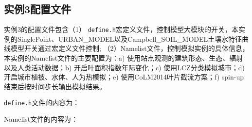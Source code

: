 \subsection{实例3配置文件}\label{ex3config}
实例3的配置文件包含（1） \texttt{define.h}宏定义文件，控制模型大模块的开关，本实例的SinglePoint、URBAN\_MODEL以及Campbell\_SOIL\_MODEL土壤水特征曲线模型开关通过宏定义文件控制; （2）Namelist文件，控制模拟实例的具体信息，本实例的Namelist文件的主要配置为：a) 使用站点观测的建筑形态、生态、辐射以及人类活动数据；b) 开启叶面积指数年际变化；c) 使用LCZ分类模拟城市；d) 开启城市植被、水体、人为热模拟；e) 使用CoLM2014叶片截流方案；f) spin-up结束后按时间步长输出模拟结果。

\texttt{define.h}文件的内容为：


Namelist文件的内容为：


